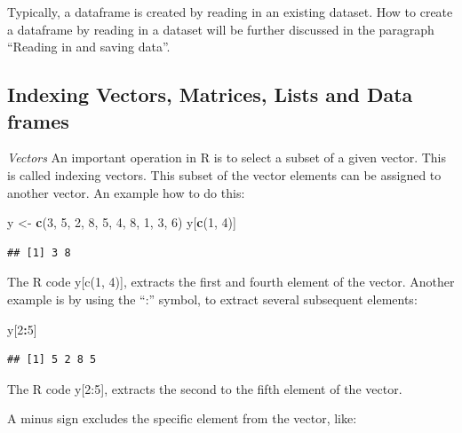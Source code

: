 \documentclass[]{book}
\newenvironment{Shaded}{\begin{snugshade}}{\end{snugshade}}
\newcommand{\KeywordTok}[1]{\textcolor[rgb]{0.13,0.29,0.53}{\textbf{#1}}}
\newcommand{\DecValTok}[1]{\textcolor[rgb]{0.00,0.00,0.81}{#1}}
\newcommand{\StringTok}[1]{\textcolor[rgb]{0.31,0.60,0.02}{#1}}
\newcommand{\OperatorTok}[1]{\textcolor[rgb]{0.81,0.36,0.00}{\textbf{#1}}}
\newcommand{\NormalTok}[1]{#1}
\begin{document}
Typically, a dataframe is created by reading in an existing dataset. How
to create a dataframe by reading in a dataset will be further discussed
in the paragraph ``Reading in and saving data''.

\subsection{Indexing Vectors, Matrices, Lists and Data
frames}\label{indexing-vectors-matrices-lists-and-data-frames}

\emph{Vectors} An important operation in R is to select a subset of a
given vector. This is called indexing vectors. This subset of the vector
elements can be assigned to another vector. An example how to do this:

\begin{Shaded}
\begin{Highlighting}[]
\NormalTok{y <-}\StringTok{ }\KeywordTok{c}\NormalTok{(}\DecValTok{3}\NormalTok{, }\DecValTok{5}\NormalTok{, }\DecValTok{2}\NormalTok{, }\DecValTok{8}\NormalTok{, }\DecValTok{5}\NormalTok{, }\DecValTok{4}\NormalTok{, }\DecValTok{8}\NormalTok{, }\DecValTok{1}\NormalTok{, }\DecValTok{3}\NormalTok{, }\DecValTok{6}\NormalTok{)}
\NormalTok{y[}\KeywordTok{c}\NormalTok{(}\DecValTok{1}\NormalTok{, }\DecValTok{4}\NormalTok{)]}
\end{Highlighting}
\end{Shaded}

\begin{verbatim}
## [1] 3 8
\end{verbatim}

The R code y{[}c(1, 4){]}, extracts the first and fourth element of the
vector. Another example is by using the ``:'' symbol, to extract several
subsequent elements:

\begin{Shaded}
\begin{Highlighting}[]
\NormalTok{y[}\DecValTok{2}\OperatorTok{:}\DecValTok{5}\NormalTok{]}
\end{Highlighting}
\end{Shaded}

\begin{verbatim}
## [1] 5 2 8 5
\end{verbatim}

The R code y{[}2:5{]}, extracts the second to the fifth element of the
vector.

A minus sign excludes the specific element from the vector, like:
\end{document}

